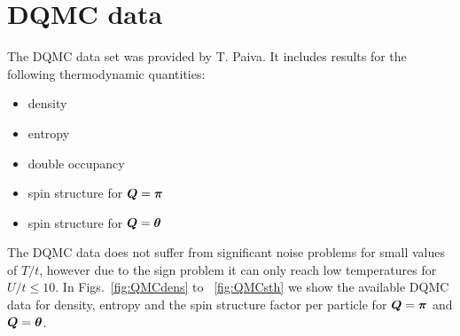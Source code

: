 \section{ DQMC data } 

The DQMC data set was provided by T. Paiva.  It includes results for the
following thermodynamic quantities:

\begin{multicols}{2}
\begin{itemize}
  \item density
  \item entropy
  \item double occupancy
  \item spin structure for $\bm{Q}=\bm{\pi}$
  \item spin structure for $\bm{Q}=\bm{\theta}$
\end{itemize}
\end{multicols}

The DQMC data does not suffer from significant noise problems for small values
of $T/t$, however due to the sign problem it can only reach low temperatures
for $U/t\leq10$.  In Figs.~\ref{fig:QMCdens} to ~\ref{fig:QMCsth} we show the
available DQMC data for density, entropy and the spin structure factor per
particle for $\bm{Q}=\bm{\pi}$ and $\bm{Q}=\bm{\theta}$.

